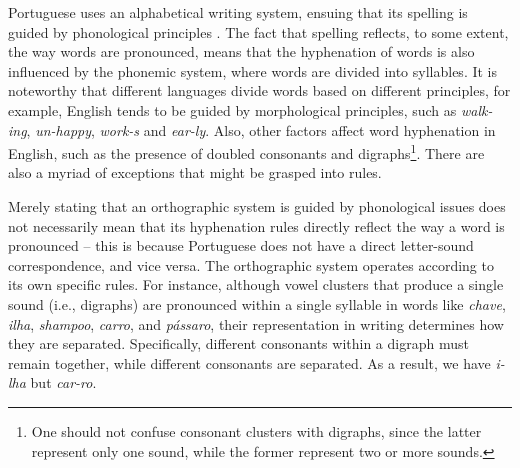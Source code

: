 \documentclass{article}
\begin{document}
Portuguese uses an alphabetical writing system, ensuing that its spelling is
guided by phonological principles \cite{cagliari2015}. The fact that spelling
reflects, to some extent, the way words are pronounced, means that the
hyphenation of words is also influenced by the phonemic system, where words are
divided into syllables. It is noteworthy that different languages divide words
based on different principles, for example, English tends to be guided by
morphological principles, such as \emph{walk-ing}, \emph{un-happy},
\emph{work-s} and \emph{ear-ly}. Also, other factors affect word hyphenation in
English, such as the presence of doubled consonants and digraphs\footnote{One
should not confuse consonant clusters with digraphs, since the latter represent
only one sound, while the former represent two or more sounds.}. There are also
a myriad of exceptions that might be grasped into rules.

Merely stating that an orthographic system is guided by phonological issues
does not necessarily mean that its hyphenation rules directly reflect the way a
word is pronounced -- this is because Portuguese does not have a direct
letter-sound correspondence, and vice versa.  The orthographic system operates
according to its own specific rules. For instance, although vowel clusters that
produce a single sound (i.e., digraphs) are pronounced within a single syllable
in words like \emph{chave}, \emph{ilha}, \emph{shampoo}, \emph{carro}, and
\emph{pássaro}, their representation in writing determines how they are
separated.  Specifically, different consonants within a digraph must remain
together, while different consonants are separated. As a result, we have
\emph{i-lha} but \emph{car-ro}.

\end{document}
